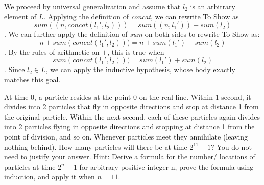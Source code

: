 \documentclass[12pt, oneside]{article}
\newif \ifsolution
\begin{document}
\begin{description}
\begin{enumerate}
{\begin{itemize}
We proceed by universal generalization and assume that $l_2$ is an arbitrary element of $L$. Applying the definition of \textit{concat}, we can rewrite To Show as $$\textit{sum}((n, \textit{concat}(l_1', l_2))) = \textit{sum}((n, l_1')) + \textit{sum}(l_2)$$. We can further apply the definition of \textit{sum} on both sides to rewrite To Show as: $$n + \textit{sum}(\textit{concat}(l_1', l_2))) = n + \textit{sum}(l_1') + \textit{sum}(l_2)$$. By the rules of arithmetic on $+$, this is true when $$\textit{sum}(\textit{concat}(l_1', l_2))) = \textit{sum}(l_1') + \textit{sum}(l_2)$$. Since $l_2 \in L$, we can apply the inductive hypothesis, whose body exactly matches this goal.

\end{itemize}
}
\fi

\end{enumerate}


\item[13. Induction and Recursion] 
At time 0, a particle resides at the point 0 on the real line.  
Within 1 second, it divides into 2 particles that fly in opposite directions and 
stop at distance 1 from the original particle. Within the next second, 
each of these particles again divides into 2 particles flying in opposite directions 
and stopping at distance 1 from the point of division, and so on. 
Whenever particles meet they annihilate (leaving nothing behind). 
How many particles will there be at time $2^{11} -1$? 
You do not need to justify your answer. 
Hint: Derive a formula for the number/ locations of particles at time $2^n-1$ for arbitrary 
positive integer n, prove the formula using induction, and apply it when $n=11$.

\ifsolution
{}
\end{description}
\end{document}
